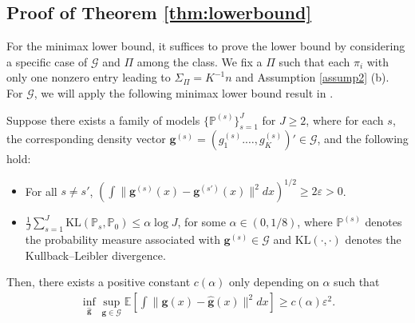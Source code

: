 \documentclass[preprint,11pt]{article}
\newcommand{\mbb}{\mathbb}
\newcommand{\mcal}{\mathcal}
\numberwithin{equation}{section}
\begin{document}
\subsection{Proof of Theorem \ref{thm:lowerbound}}
For the minimax lower bound, it suffices to prove the lower bound by considering a specific case of $\mcal{G}$ and $\Pi$ among the class. We fix a $\Pi$ such that each $\pi_i$ with only one nonzero entry leading to $\Sigma_{\Pi}=K^{-1}n$ and Assumption \ref{assump2} (b). For $\mcal{G}$, we will apply the following minimax lower bound result in \cite[Theorem 2.7]{tsybakov2009introduction}.
\begin{lemma}\label{lem:minimaxlowerboundgeneral}
    Suppose there exists a family of models $\{\mbb{P}^{(s)}\}_{s=1}^J$ for $J\ge 2$, where for each $s$, the corresponding density vector $\bm{g}^{(s)}=(g_1^{(s)}.\ldots,g_K^{(s)})'\in\mcal{G}$, and the following hold:
    \begin{itemize}
        \item [(a).] For all $s\neq s'$, $\left(\int \|\bm{g}^{(s)}(x)-\bm{g}^{(s')}(x)\|^2 dx\right)^{1/2}\ge 2\varepsilon>0$.
        \vspace{0.1in}
        \item [(b).] $\frac{1}{J}\sum_{s=1}^J \text{KL}(\mbb{P}_s,\mbb{P}_0)\le \alpha\log J$, for some $\alpha\in (0,1/8)$, where $\mbb{P}^{(s)}$ denotes the probability measure associated with $\bm{g}^{(s)}\in\mcal{G}$ and $\text{KL}(\cdot,\cdot)$ denotes the Kullback–Leibler divergence.
    \end{itemize}
    Then, there exists a positive constant $c(\alpha)$ only depending on $\alpha$ such that
    \begin{align*}
        \inf_{\widehat{\bm{g}}}\sup_{\bm{g}\in\mcal{G}}\mbb{E}\left[\int \|\bm{g}(x)-\bm{\widehat{g}}(x)\|^2dx\right]\ge c(\alpha)\varepsilon^2.
    \end{align*}
\end{lemma}
\end{document}
